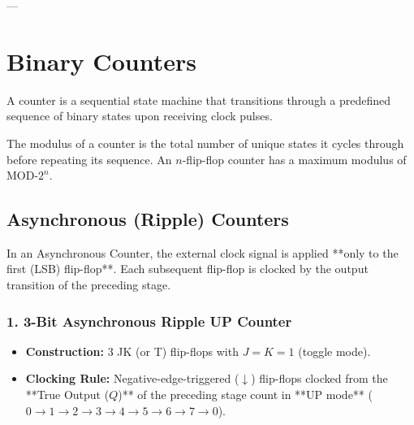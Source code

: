 ---

\section{Binary Counters}
A counter is a sequential state machine that transitions through a predefined sequence of binary states upon receiving clock pulses.

\begin{definition}
The modulus of a counter is the total number of unique states it cycles through before repeating its sequence. An $n$-flip-flop counter has a maximum modulus of $\text{MOD-}2^n$.
\end{definition}

\subsection{Asynchronous (Ripple) Counters}
In an Asynchronous Counter, the external clock signal is applied **only to the first (LSB) flip-flop**. Each subsequent flip-flop is clocked by the output transition of the preceding stage.

\subsubsection{1. 3-Bit Asynchronous Ripple UP Counter}
\begin{itemize}
    \item \textbf{Construction:} 3 JK (or T) flip-flops with $J = K = 1$ (toggle mode).
    \item \textbf{Clocking Rule:} Negative-edge-triggered ($\downarrow$) flip-flops clocked from the **True Output ($Q$)** of the preceding stage count in **UP mode** ($0 \rightarrow 1 \rightarrow 2 \rightarrow 3 \rightarrow 4 \rightarrow 5 \rightarrow 6 \rightarrow 7 \rightarrow 0$).
\end{itemize}

